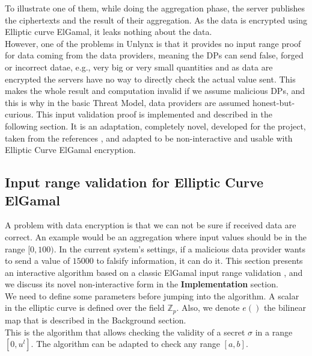 \documentclass{article}
\begin{document}
To illustrate one of them, while doing the aggregation phase, the server publishes the ciphertexts and the result of their aggregation. As the data is encrypted using Elliptic curve ElGamal, it leaks nothing about the data.\\
However, one of the problems in Unlynx is that it provides no input range proof for data coming from the data providers, meaning the DPs can send false, forged or incorrect datae, e.g., very big or very small quantities and as data are encrypted the servers have no way to directly check the actual value sent. This makes the whole result and computation invalid if we assume malicious DPs, and this is why in the basic Threat Model, data providers are assumed honest-but-curious. This input validation proof is implemented and described in the following section.  It is an adaptation, completely novel, developed for the project, taken from the references \cite{range}, and adapted to be non-interactive and usable with Elliptic Curve ElGamal encryption.\\

\subsection{Input range validation for Elliptic Curve ElGamal}

A problem with data encryption is that we can not be sure if received data are correct. An example would be an aggregation where input values should be in the range $[0,100)$. In the current system's settings, if a malicious data provider wants to send a value of $15000$ to falsify information, it can do it. This section presents an  interactive algorithm based on a classic ElGamal input range validation \cite{range}, and we discuss its novel non-interactive form in the \textbf{Implementation} section.\\
We need to define some parameters before jumping into the algorithm. A scalar in the elliptic curve is defined over the field $\mathbb{Z}_p$. Also, we denote $e()$ the bilinear map that is described in the Background section.\\
This is the algorithm that allows checking the validity of a secret $\sigma$ in a range $ [0,u^l]$. The algorithm can be adapted to check any range $[a,b]$.\\
\end{document}
